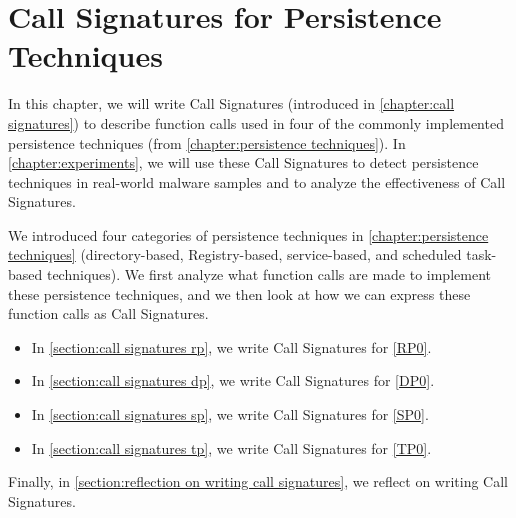\chapter{Call Signatures for Persistence Techniques}\label{chapter:call signatures for persistence techniques}
In this chapter, we will write Call Signatures (introduced in \autoref{chapter:call signatures}) to describe function calls used in four of the commonly implemented persistence techniques (from \autoref{chapter:persistence techniques}). In \autoref{chapter:experiments}, we will use these Call Signatures to detect persistence techniques in real-world malware samples and to analyze the effectiveness of Call Signatures.

\medskip

We introduced four categories of persistence techniques in \autoref{chapter:persistence techniques} (directory-based, Registry-based, service-based, and scheduled task-based techniques). We first analyze what function calls are made to implement these persistence techniques, and we then look at how we can express these function calls as Call Signatures.

\begin{itemize}
    \item In \autoref{section:call signatures rp}, we write Call Signatures for \autoref{RP0}.
    \item In \autoref{section:call signatures dp}, we write Call Signatures for \autoref{DP0}.
    \item In \autoref{section:call signatures sp}, we write Call Signatures for \autoref{SP0}.
    \item In \autoref{section:call signatures tp}, we write Call Signatures for \autoref{TP0}.
\end{itemize}

Finally, in \autoref{section:reflection on writing call signatures}, we reflect on writing Call Signatures.






